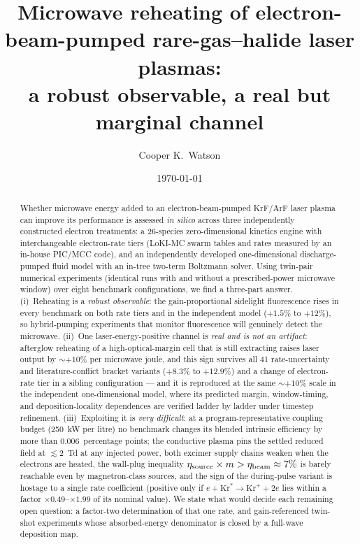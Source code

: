 \documentclass[aps,pra,preprint,longbibliography,nofootinbib]{revtex4-2}
\newcommand{\todo}[1]{\textcolor{red}{[TODO: #1]}}
\begin{document}
\title{Microwave reheating of electron-beam-pumped rare-gas--halide
laser plasmas:\\ a robust observable, a real but marginal channel}

\author{Cooper K.\ Watson}
\affiliation{Texas A\&M University\todo{verify department/affiliation line}}

\date{\today}

\begin{abstract}
Whether microwave energy added to an electron-beam-pumped KrF/ArF laser
plasma can improve its performance is assessed \emph{in silico} across
three independently constructed electron treatments: a 26-species
zero-dimensional kinetics engine with interchangeable electron-rate
tiers (LoKI-MC swarm tables and rates measured by an in-house PIC/MCC
code), and an independently developed one-dimensional discharge-pumped
fluid model with an in-tree two-term Boltzmann solver. Using twin-pair
numerical experiments (identical runs with and without a
prescribed-power microwave window) over eight benchmark configurations,
we find a three-part answer. (i)~Reheating is a \emph{robust
observable}: the gain-proportional sidelight fluorescence rises in
every benchmark on both rate tiers and in the independent model
($+1.5\%$ to $+12\%$), so hybrid-pumping experiments that monitor
fluorescence will genuinely detect the microwave. (ii)~One
laser-energy-positive channel is \emph{real and is not an artifact}:
afterglow reheating of a high-optical-margin cell that is still
extracting raises laser output by ${\sim}+10\%$ per microwave joule,
and this sign survives all 41 rate-uncertainty and literature-conflict
bracket variants ($+8.3\%$ to $+12.9\%$) and a change of electron-rate
tier in a sibling configuration --- and it is reproduced at the same
${\sim}+10\%$ scale in the independent one-dimensional model, where
its predicted margin, window-timing, and deposition-locality
dependences are verified ladder by ladder under timestep refinement.
(iii)~Exploiting it is \emph{very difficult}: at a
program-representative coupling budget (250~kW per litre) no benchmark
changes its blended intrinsic efficiency by more than
$0.006$~percentage points; the conductive plasma pins the settled
reduced field at ${\lesssim}2$~Td at any injected power, both excimer
supply chains weaken when the electrons are heated, the wall-plug
inequality $\eta_{\rm source}\times m>\eta_{\rm beam}\approx7\%$ is
barely reachable even by magnetron-class sources, and the sign of the
during-pulse variant is hostage to a single rate coefficient (positive
only if $e+\mathrm{Kr}^*\!\to\mathrm{Kr}^++2e$ lies within a factor
$\times0.49$--$\times1.99$ of its nominal value). We state what would
decide each remaining open question: a factor-two determination of
that one rate, and gain-referenced twin-shot experiments whose
absorbed-energy denominator is closed by a full-wave deposition map.
\end{abstract}
\end{document}
